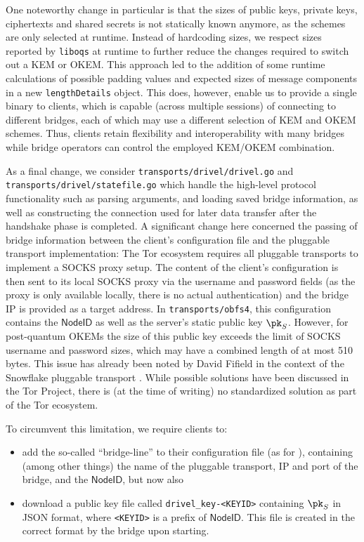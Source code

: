 One noteworthy change in particular is that the sizes of public keys, private keys, ciphertexts and shared secrets is not statically known anymore, as the schemes are only selected at runtime.
Instead of hardcoding sizes, we respect sizes reported by \texttt{liboqs} at runtime to further reduce the changes required to switch out a KEM or OKEM.
This approach led to the addition of some runtime calculations of possible padding values and expected sizes of message components in a new \texttt{lengthDetails} object.
This does, however, enable us to provide a single binary to clients, which is capable (across multiple sessions) of connecting to different bridges, each of which may use a different selection of KEM and OKEM schemes. Thus, clients retain flexibility and interoperability with many bridges while bridge operators can control the employed KEM/OKEM combination.

As a final change, we consider \texttt{transports/drivel/drivel.go} and \texttt{transports/drivel/statefile.go} which handle the high-level protocol functionality such as parsing arguments, and loading saved bridge information, as well as constructing the connection used for later data transfer after the handshake phase is completed.
A significant change here concerned the passing of bridge information between the client's configuration file and the pluggable transport implementation: The Tor ecosystem requires all pluggable transports to implement a SOCKS proxy setup. The content of the client's configuration is then sent to its local SOCKS proxy via the username and password fields (as the proxy is only available locally, there is no actual authentication) and the bridge IP is provided as a target address. In \texttt{transports/obfs4}, this configuration contains the $\mathsf{NodeID}$ as well as the server's static public key $\pk_S$. However, for post-quantum OKEMs the size of this public key exceeds the limit of SOCKS username and password sizes, which may have a combined length of at most 510 bytes. This issue has already been noted by David Fifield in the context of the Snowflake pluggable transport \cite{torprojectSnowflakeBridge}. While possible solutions have been discussed in the Tor Project, there is (at the time of writing) no standardized solution as part of the Tor ecosystem.

To circumvent this limitation, we require clients to:
\begin{itemize}
    \item add the so-called ``bridge-line'' to their configuration file (as for \obfsfour{}), containing (among other things) the name of the pluggable transport, IP and port of the bridge, and the $\mathsf{NodeID}$, but now also
    \item download a public key file called \texttt{drivel\_key-<KEYID>} containing $\pk_S$ in JSON format, where \texttt{<KEYID>} is a prefix of $\mathsf{NodeID}$. This file is created in the correct format by the bridge upon starting.
\end{itemize}


